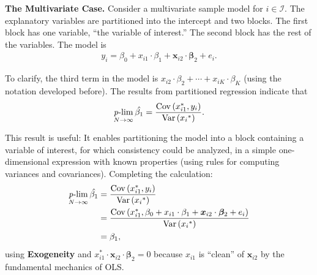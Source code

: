 \noindent \textbf{The Multivariate Case.} Consider a multivariate sample model for $i \in \mathcal{I}$. The explanatory variables are partitioned into the intercept and two blocks. The first block has one variable, ``the variable of interest.'' The second block has the rest of the variables. The model is
\begin{align}
	y_i = \beta_0 + x_{i1} \cdot \beta_1  + \bm{x}_{i2} \cdot \bm{\beta}_2 + e_i. 
\end{align}

\noindent To clarify, the third term in the model is $x_{i2} \cdot \beta_2 + \cdots + x_{iK} \cdot \beta_K$ (using the notation developed before). The results from partitioned regression indicate that 
\begin{align}
	\operatorname*{\mathit{p}-lim}_{N \rightarrow \infty} \hat{\beta_1} = \frac{\operatorname{Cov} \left( x_{i1}^*, y_i \right)} {\operatorname{Var} \left( {x_i}^* \right)}. 
\end{align}

\noindent This result is useful: It enables partitioning the model into a block containing a variable of interest, for which consistency could be analyzed, in a simple one-dimensional expression with known properties (using rules for computing variances and covariances). Completing the calculation: 
\begin{align}
	\operatorname*{\mathit{p}-lim}_{N \rightarrow \infty} \hat{\beta_1} & = \frac{\operatorname{Cov} \left( x_{i1}^*, y_i \right)} {\operatorname{Var} \left( {x_i}^* \right)} \nonumber \\ 
											   & = \frac{\operatorname{Cov} \left( x_{i1}^*, \beta_0 + x_{i1} \cdot \beta_1  + \bm{x}_{i2} \cdot \bm{\beta}_2 + e_i \right)} {\operatorname{Var} \left( {x_i}^* \right)} \nonumber \\ 
											   & = \beta_1, 
\end{align}
using \textbf{Exogeneity} and $x_{i1}^* \cdot \bm{x}_{i2} \cdot \bm{\beta}_2 = 0$ because $x_{i1}$ is ``clean'' of $\bm{x}_{i2}$ by the fundamental mechanics of OLS. 




